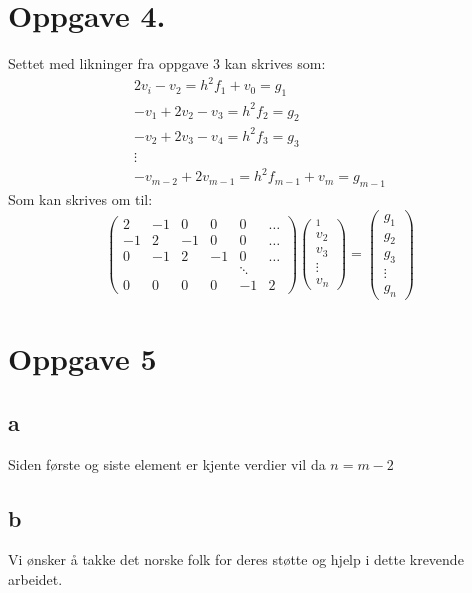 \documentclass[english,notitlepage]{revtex4-1}  %
\begin{document}
\section*{Oppgave 4.}
    \label{sec:oppgave4}
    Settet med likninger fra oppgave 3 kan skrives som: 
    \begin{align*}
            2v_i - v_2 
        =   h^2 f_1  + v_0
        =   g_1\\
            -v_1 + 2v_2 -v_3 
        =   h^2 f_2 
        =   g_2\\
            -v_2 + 2v_3- v_4 
        =   h^2 f_3 
        =   g_3\\
        \vdots\\
            -v_{m-2} + 2 v_{m-1} 
        =   h^2 f_{m-1} + v_m 
        =   g_{m-1}
    \end{align*}
    Som kan skrives om til:
    \begin{equation*}
            \begin{pmatrix}
                2 & -1 & 0 &0 & 0 & \dots
                \\
                -1 & 2 & -1 & 0 & 0 & \dots
                \\
                0 & -1 & 2 & -1 & 0 & \dots
                \\
                & & & &  \ddots
                \\
                0 & 0 & 0 & 0 & -1 & 2 
            \end{pmatrix}
            \begin{pmatrix}
                _1 \\ v_2 \\ v_3 \\ \vdots \\ v_n 
            \end{pmatrix} 
        = 
            \begin{pmatrix}
                g_1 \\ g_2 \\ g_3 \\ \vdots \\ g_n
            \end{pmatrix}
    \end{equation*}


\section*{Oppgave 5}
    \subsection*{a}
        \label{sec:oppgave5a}
        Siden første og siste element er kjente verdier vil da  $n = m-2$
    \subsection*{b}
        \label{sec:oppgave5b}

\begin{acknowledgements}
Vi ønsker å takke det norske folk for deres støtte og hjelp i dette krevende arbeidet. 
\end{acknowledgements}

   
\end{document}
